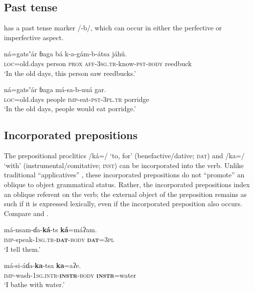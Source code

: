 \documentclass[output=paper]{langsci/langscibook}
\begin{document}
\subsection{Past tense}\label{sec:ahlandc:4.4}

 has a past tense marker /-b/, which can occur in either the perfective  or imperfective  aspect.

\ea\label{ex:ahlandc:21}
\gll
ná=gatsʼár       ɓaga      bá  k-a-gám-b-átsa   jáhú. \\
\textsc{loc}=old.days  person   \textsc{prox}   \textsc{aff-3sg.tr}{}-know-\textsc{pst-body}  reedbuck \\
\glt
‘In the old days, this person saw reedbucks.’
\z

\ea\label{ex:ahlandc:22}
\gll
ná=gatsʼár       ɓaga    má-sa-b-uuá  gar. \\
\textsc{loc}=old.days   people \textsc{imp}{}-eat-\textsc{pst}{}-\textsc{3pl.tr}  porridge \\
\glt
‘In the old days, people would eat porridge.’
\z


\subsection{Incorporated prepositions}\label{sec:ahlandc:4.5}

The prepositional proclitics /ká=/ ‘to, for’ (benefactive/dative; \textsc{dat}) and /ka=/ ‘with’ (instrumental/comitative; \textsc{inst}) can be incorporated into the verb. Unlike traditional “applicatives” \citep{Payne1997}, these incorporated prepositions do not “promote” an oblique to object grammatical status. Rather, the incorporated prepositions index an oblique referent on the verb; the external object of the preposition remains as such if it is expressed lexically, even if the incorporated preposition also occurs. Compare  and . 

\ea\label{ex:ahlandc:23}
\gll
má-nsam-ɗa-\textbf{ká}{}-ts                      \textbf{ká}=máʔam. \\
\textsc{imp}{}-speak-\textsc{1sg.tr-}\textbf{\textsc{dat}}\textsc{{}-body} \textbf{\textsc{dat}}\textsc{=3pl} \\
\glt
‘I tell them.’
\z

\ea\label{ex:ahlandc:24}
\gll
má-si-áɗa-\textbf{ka}{}-tsa    \textbf{ka}=aʔe. \\
\textsc{imp}{}-wash-\textsc{1sg.intr-}\textbf{\textsc{instr}}\textsc{{}-body} \textbf{\textsc{instr}}\textsc{=}water   \\
\glt
‘I bathe with water.’
\z
\end{document}

